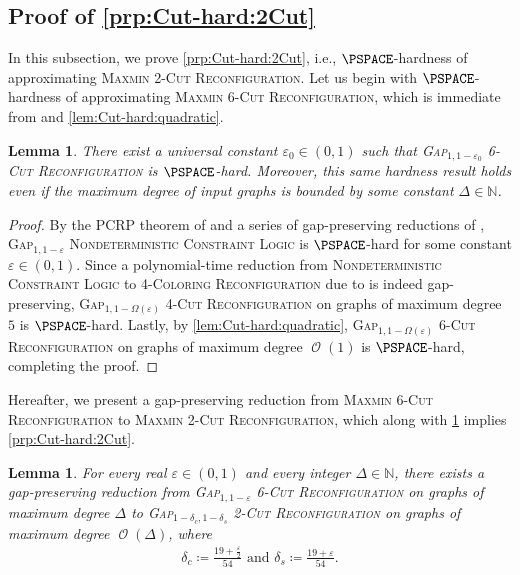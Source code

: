 \documentclass[11pt,fleqn]{article}
\renewcommand{\epsilon}{\varepsilon}
\newcommand{\prb}[1]{\textsc{#1}\xspace}
\newcommand{\defeq}{\coloneq}
\DeclareMathOperator{\bigO}{\mathcal{O}}
\newcommand{\twoCutReconf}{\prb{2-Cut Reconfiguration}}
\newcommand{\sixCutReconf}{\prb{6-Cut Reconfiguration}}
\newcommand{\MMtwoCutReconf}{\prb{Maxmin 2-Cut Reconfiguration}}
\newcommand{\MMsixCutReconf}{\prb{Maxmin 6-Cut Reconfiguration}}
\newcommand{\bbN}{\mathbb{N}}
\newtheorem{lemma}[theorem]{Lemma}
\theoremstyle{definition}
\numberwithin{equation}{section}
\begin{document}
\subsection{Proof of \texorpdfstring{\cref{prp:Cut-hard:2Cut}}{Proposition~\protect\ref{prp:Cut-hard:2Cut}}}
\label{app:Cut-hard:2Cut}
In this subsection, we prove \cref{prp:Cut-hard:2Cut}, i.e.,
$\PSPACE$-hardness of approximating \MMtwoCutReconf.
Let us begin with $\PSPACE$-hardness of approximating \MMsixCutReconf, which is immediate from
\cite{hirahara2024probabilistically,ohsaka2023gap,bonsma2009finding} and \cref{lem:Cut-hard:quadratic}.


\begin{lemma}
\label{lem:Cut-hard:6Cut}
    There exist a universal constant $\epsilon_0 \in (0,1)$ such that
    \prb{Gap$_{1,1-\epsilon_0}$ \sixCutReconf} is $\PSPACE$-hard.
    Moreover, this same hardness result holds even if 
    the maximum degree of input graphs is bounded by some constant $\Delta \in \bbN$.
\end{lemma}
\begin{proof} By the PCRP theorem of \citet{hirahara2024probabilistically} and
a series of gap-preserving reductions of \citet{ohsaka2023gap},
\prb{Gap$_{1,1-\epsilon}$ Nondeterministic Constraint Logic}
is $\PSPACE$-hard for some constant $\epsilon \in (0,1)$.
Since a polynomial-time reduction from
\prb{Nondeterministic Constraint Logic} to
\prb{4-Coloring Reconfiguration} due to \citet{bonsma2009finding}
is indeed gap-preserving,
\prb{Gap$_{1,1-\Omega(\epsilon)}$ 4-Cut Reconfiguration}
on graphs of maximum degree $5$ is $\PSPACE$-hard.
Lastly, by \cref{lem:Cut-hard:quadratic},
\prb{Gap$_{1,1-\Omega(\epsilon)}$ \sixCutReconf}
on graphs of maximum degree $\bigO(1)$ is $\PSPACE$-hard,
completing the proof.
\end{proof}



Hereafter, we present a gap-preserving reduction from
\MMsixCutReconf to \MMtwoCutReconf,
which along with \cref{lem:Cut-hard:6Cut} implies \cref{prp:Cut-hard:2Cut}.


\begin{lemma}
\label{lem:Cut-hard:6-to-2}
    For every real $\epsilon \in (0,1)$ and
    every integer $\Delta \in \bbN$,
    there exists a gap-preserving reduction from
    \prb{Gap$_{1,1-\epsilon}$ \sixCutReconf}
    on graphs of maximum degree $\Delta$
    to
    \prb{Gap$_{1-\delta_c,1-\delta_s}$ \twoCutReconf}
    on graphs of maximum degree $\bigO(\Delta)$, where
    \begin{align}
        \delta_c \defeq \frac{19+\frac{\epsilon}{2}}{54} \text{ and }
        \delta_s \defeq \frac{19+\epsilon}{54}.
    \end{align}
\end{lemma}
\end{document}
